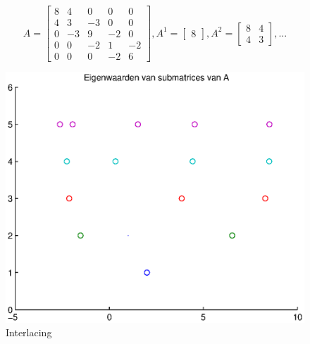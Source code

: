 \documentclass[]{article}
\begin{document}
\begin{equation}
A=\begin{bmatrix}
    	8 & 4 & 0 & 0 & 0	\\
    	4 & 3 & -3 & 0 & 0 \\
    	0 & -3 & 9 & -2 & 0 \\
    	0 & 0 & -2 & 1 & -2 \\
    	0 & 0 & 0 & -2 & 6 
    \end{bmatrix}
    ,
    A^{1}=\begin{bmatrix}
        	8
        \end{bmatrix}
        ,
    A^{2}=\begin{bmatrix}
           	8 & 4 \\
           	4 & 3
         \end{bmatrix}
         , ...
\end{equation}
\begin{figure}[h]
\noindent \includegraphics[width=1\linewidth]{opgave7.eps}
\caption{Interlacing}
\label{opgave71}
\end{figure}

\pagebreak 

\begin{table}[h]
\noindent{}
\caption{Eigenwaarden van de principiele submatrices van A}
\label{opgave72}
\end{table}
\end{document}
